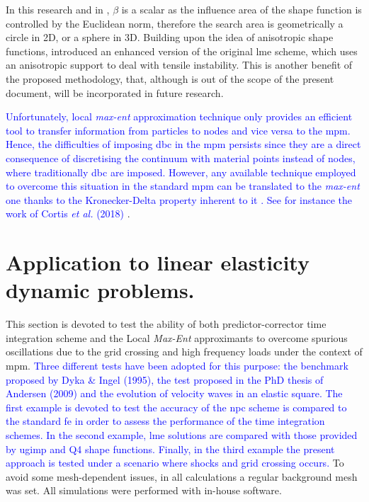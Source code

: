\documentclass[preprint,12pt,a4paper]{elsarticle}
\newcommand{\MODIFIED}[1]{
  \textcolor{blue}{{#1}}
}
\begin{document}
In this research and in \cite{Arroyo2006}, $\beta$ is a scalar as the
influence area of the shape function is controlled by the Euclidean
norm, therefore the search area is geometrically a circle in 2D, or a
sphere in 3D. Building upon the idea of anisotropic shape functions,
\cite{Kochmann2019} introduced an enhanced version of the original
\acrshort{lme} scheme, which uses an anisotropic support to deal with 
tensile instability. This is another benefit of the proposed methodology, that, although is out of the scope of the present document, will be incorporated in future research.
\MODIFIED{Unfortunately, local \textit{max-ent} approximation technique only provides an efficient tool to transfer information from particles to nodes and vice versa to the \acrshort{mpm}. Hence, the difficulties of imposing \acrshort{dbc} in the \acrshort{mpm} persists since they are a direct consequence of discretising the continuum with material points instead of nodes, where traditionally \acrshort{dbc} are imposed. However, any available technique employed to overcome this situation in the standard \acrshort{mpm} can be translated to the \textit{max-ent} one thanks to the Kronecker-Delta property inherent to it \cite{Arroyo2006}. See for instance the work of Cortis {\it et al.} (2018) \cite{Cortis2018a}}.

\section{Application to linear elasticity dynamic problems.}
\label{sec:Application-linear-elasticity-dynamic-problems}

This section is devoted to test the ability of both predictor-corrector
time integration scheme and the Local \textit{Max-Ent} approximants to
overcome spurious oscillations due to the grid crossing and high
frequency loads under the context of \acrshort{mpm}. \MODIFIED{Three different tests have
been adopted for this purpose: the benchmark proposed by Dyka \& Ingel
(1995)\cite{Dyka1995}, the test proposed in the PhD thesis of
Andersen (2009)\cite{thesis_Andersen_2009} and the evolution of velocity waves in an elastic square. The first example is devoted to test the accuracy of the \acrfull{npc} scheme is compared to the standard \acrfull{fe} in order to assess the performance of the time integration schemes. In the second example,  \acrshort{lme} solutions
are compared with those provided by \acrfull{ugimp} and Q4 shape
functions. Finally, in the third example the present approach is tested under a scenario where shocks and grid crossing occurs.} To avoid some mesh-dependent issues, in all
calculations a regular background mesh was set. All simulations were
performed with in-house software.
\end{document}
